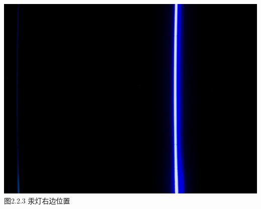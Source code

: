 \documentclass{ctexart}
\begin{document}
\begin{minipage}[c]{0.33\textwidth}
    \includegraphics[scale=0.05]{3-2} \\\small{图2.2.3 汞灯右边位置}\centering
\end{minipage}
\end{document}
